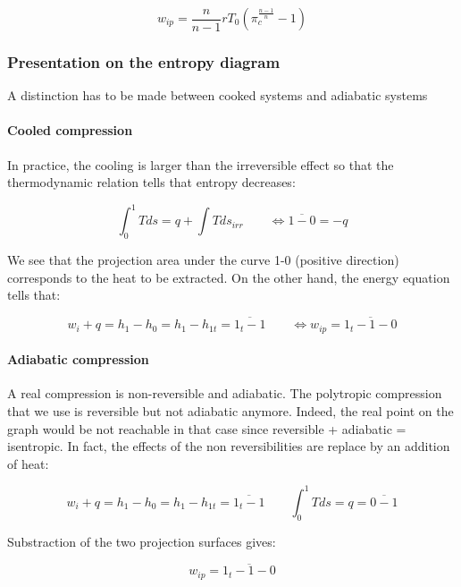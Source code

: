 \begin{equation}
w_{ip} = \frac{n}{n-1}rT_0\left( \pi _c ^{\frac{n-1}{n}} -1 \right)
\end{equation}

\subsubsection{Presentation on the entropy diagram}
A distinction has to be made between cooked systems and adiabatic systems

\paragraph{Cooled compression}
In practice, the cooling is larger than the irreversible effect so that the thermodynamic relation tells that entropy decreases: 

\begin{equation}
\int _0^1 Tds = q + \int Tds _{irr} \qquad \Leftrightarrow \overline{1-0} = -q
\end{equation}

We see that the projection area under the curve 1-0 (positive direction) corresponds to the heat to be extracted. On the other hand, the energy equation tells that: 

\begin{equation}
w_i + q = h_1 - h_0 = h_1 - h_{1t} = \overline{1_t - 1} \qquad \Leftrightarrow w_{ip} = \overline{1_t -1 -0}
\end{equation}

\paragraph{Adiabatic compression}
A real compression is non-reversible and adiabatic. The polytropic compression that we use is reversible but not adiabatic anymore. Indeed, the real point on the graph would be not reachable in that case since reversible + adiabatic = isentropic. In fact, the effects of the non reversibilities are replace by an addition of heat: 

\begin{equation}
w_i + q = h_1 - h_0 = h_1 - h_{1t} = \overline{1_t - 1} \qquad \int _0^1 Tds = q = \overline{0-1}
\end{equation}

Substraction of the two projection surfaces gives: 

\begin{equation}
w_{ip} = \overline{1_t - 1 - 0}
\end{equation}

